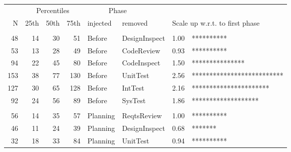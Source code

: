 \documentclass{sig-alternate}
\def\baselinestretch{1}
\begin{document}
\begin{figure}[!t] 
 \renewcommand{\baselinestretch}{0.7}
 \scriptsize
\begin{center}
\begin{tabular}{r@{~}|r@{~}r@{~}r|@{~}l@{~}l|@{~}r@{~}l}  %
  \multicolumn{1}{c}{~} &\multicolumn{3}{c}{Percentiles}&\multicolumn{2}{l}{~~~~~~Phase}\\%
N & 25th & 50th & 75th &   injected & removed   & \multicolumn{2}{l}{Scale up w.r.t. to first phase}\\\hline
\\
 48&   14&   30&   51&Before&DesignInspect &1.00 & **********  \\
 53&   13&   28&   49&Before&CodeReview &0.93 & **********  \\
 94&   22&   45&   80&Before&CodeInspect &1.50 & ***************  \\
153&   38&   77&  130&Before&UnitTest &2.56 & **************************  \\
127&   30&   65&  128&Before&IntTest &2.16 & **********************  \\
 92&   24&   56&   89&Before&SysTest &1.86 & *******************  \\
 
 
\\
 56&   14&   35&   57&Planning&ReqtsReview &1.00 & **********  \\
 46&   11&   24&   39&Planning&DesignInspect &0.68 & *******  \\
 32&   18&   33&   84&Planning&UnitTest &0.94 & **********  \\
 

\end{tabular}
\end{center}
\end{figure}
\end{document}
